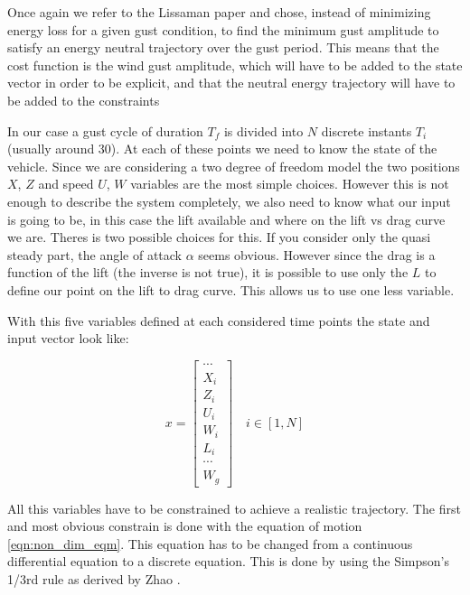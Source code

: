 \par Once again we refer to the Lissaman paper \cite{Lissaman2007neutral} and chose, instead of minimizing energy loss for a given gust condition, to find the minimum gust amplitude to satisfy an energy neutral trajectory over the gust period.
This means that the cost function is the wind gust amplitude, which will have to be added to the state vector in order to be explicit, and that the neutral energy trajectory will have to be added to the constraints


\par In our case a gust cycle of duration $T_f$ is divided into $N$ discrete instants $T_i$ (usually around 30).
At each of these points we need to know the state of the vehicle.
Since we are considering a two degree of freedom model the two positions $X$, $Z$ and speed $U$, $W$ variables are the most simple choices.
However this is not enough to describe the system completely, we also need to know what our input is going to be, in this case the lift available and where on the lift vs drag curve we are.
Theres is two possible choices for this.
If you consider only the quasi steady part, the angle of attack $\alpha$ seems obvious.
However since the drag is a function of the lift (the inverse is not true), it is possible to use only the $L$ to define our point on the lift to drag curve.
This allows us to use one less variable.

\par With this five variables defined at each considered time points the state and input vector look like:

\begin{equation}
	x= 
	\begin{bmatrix}
		\cdots \\
		X_i \\
		Z_i \\
		U_i \\
		W_i \\
		L_i \\
		\cdots \\
		W_g
	\end{bmatrix}
	\quad i \in [1,N]
	\label{eqn:big_vector}
\end{equation}

\par All this variables have to be constrained to achieve a realistic trajectory.
The first and most obvious constrain is done with the equation of motion \ref{eqn:non_dim_eqm}.
This equation has to be changed from a continuous differential equation to a discrete equation.
This is done by using the Simpson's 1/3rd rule as derived by Zhao \cite{zhao2004optimal}.

